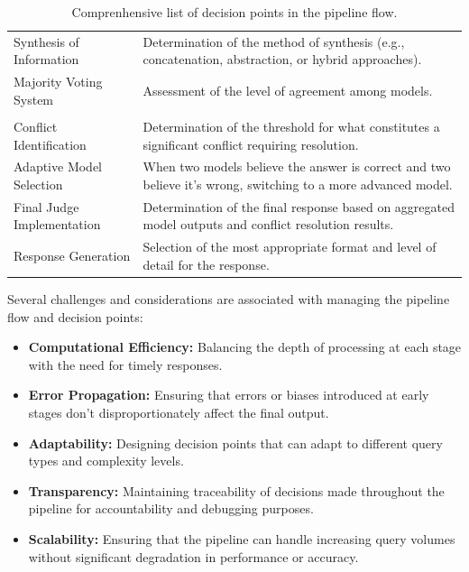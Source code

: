 \begin{table}[h!]
{\begin{tabular}{lp{9cm}}
            Synthesis of Information & Determination of the method of synthesis (e.g., concatenation, abstraction, or hybrid approaches). \\
            Majority Voting System & Assessment of the level of agreement among models. \\
            \hdashline
            \multicolumn{2}{c}{\colorbox{pink}{\textit{Conflict Resolution and Final Output Generation}}} \\
            Conflict Identification & Determination of the threshold for what constitutes a significant conflict requiring resolution. \\
            Adaptive Model Selection & When two models believe the answer is correct and two believe it's wrong, switching to a more advanced model. \\
            Final Judge Implementation & Determination of the final response based on aggregated model outputs and conflict resolution results. \\
            Response Generation & Selection of the most appropriate format and level of detail for the response. \\
            \bottomrule
        \end{tabular}}\caption{Comprenhensive list of decision points in the pipeline flow.}
    \label{tab:pipeline-decision-points}
\end{table}

Several challenges and considerations are associated with managing the pipeline flow and decision points:
\begin{itemize}
    \item \textbf{Computational Efficiency:} Balancing the depth of processing at each stage with the need for timely responses.
    \item \textbf{Error Propagation:} Ensuring that errors or biases introduced at early stages don't disproportionately affect the final output.
    \item \textbf{Adaptability:} Designing decision points that can adapt to different query types and complexity levels.
    \item \textbf{Transparency:} Maintaining traceability of decisions made throughout the pipeline for accountability and debugging purposes.
    \item \textbf{Scalability:} Ensuring that the pipeline can handle increasing query volumes without significant degradation in performance or accuracy.
\end{itemize}

